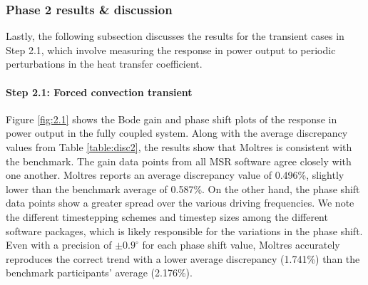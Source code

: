 \subsubsection{Phase 2 results \& discussion}

Lastly, the following subsection discusses the results for the transient cases
in Step 2.1, which involve measuring the response in power output to periodic
perturbations in the heat transfer coefficient.

\paragraph{Step 2.1: Forced convection transient}

Figure \ref{fig:2.1} shows the Bode gain and phase shift plots of the response
in power output in the fully coupled system. Along with the average discrepancy
values from Table \ref{table:disc2}, the results show that Moltres is
consistent with the benchmark. The gain data points from all \gls{MSR} software
agree closely with one another. Moltres reports an average discrepancy value of
0.496\%, slightly lower than the benchmark average of 0.587\%. On the other
hand, the phase shift data points show a greater spread over the various driving
frequencies. We note the different timestepping schemes and timestep
sizes among the different software packages, which is likely responsible for
the variations in the phase shift. Even with a precision of
$\pm0.9^\circ$ for each phase shift value, Moltres accurately reproduces the
correct trend with a lower average discrepancy (1.741\%) than the benchmark
participants' average (2.176\%).

\FloatBarrier

